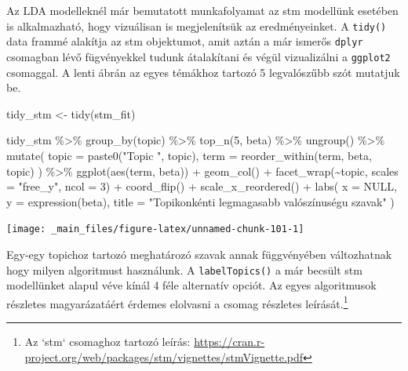 \documentclass[
]{book}
\newenvironment{Shaded}{\begin{snugshade}}{\end{snugshade}}
\newcommand{\AttributeTok}[1]{\textcolor[rgb]{0.77,0.63,0.00}{#1}}
\newcommand{\ConstantTok}[1]{\textcolor[rgb]{0.00,0.00,0.00}{#1}}
\newcommand{\DecValTok}[1]{\textcolor[rgb]{0.00,0.00,0.81}{#1}}
\newcommand{\FunctionTok}[1]{\textcolor[rgb]{0.00,0.00,0.00}{#1}}
\newcommand{\NormalTok}[1]{#1}
\newcommand{\OtherTok}[1]{\textcolor[rgb]{0.56,0.35,0.01}{#1}}
\newcommand{\SpecialCharTok}[1]{\textcolor[rgb]{0.00,0.00,0.00}{#1}}
\newcommand{\StringTok}[1]{\textcolor[rgb]{0.31,0.60,0.02}{#1}}
\begin{document}
Az LDA modelleknél már bemutatott munkafolyamat az stm modellünk
esetében is alkalmazható, hogy vizuálisan is megjelenítsük az
eredményeinket. A \texttt{tidy()} data frammé alakítja az stm
objektumot, amit aztán a már ismerős \texttt{dplyr} csomagban lévő
fügvényekkel tudunk átalakítani és végül vizualizálni a \texttt{ggplot2}
csomaggal. A lenti ábrán az egyes témákhoz tartozó 5 legvalószűbb szót
mutatjuk be.

\begin{Shaded}
\begin{Highlighting}[]

\NormalTok{tidy\_stm }\OtherTok{\textless{}{-}} \FunctionTok{tidy}\NormalTok{(stm\_fit)}

\NormalTok{tidy\_stm }\SpecialCharTok{\%\textgreater{}\%}
  \FunctionTok{group\_by}\NormalTok{(topic) }\SpecialCharTok{\%\textgreater{}\%}
  \FunctionTok{top\_n}\NormalTok{(}\DecValTok{5}\NormalTok{, beta) }\SpecialCharTok{\%\textgreater{}\%}
  \FunctionTok{ungroup}\NormalTok{() }\SpecialCharTok{\%\textgreater{}\%}
  \FunctionTok{mutate}\NormalTok{(}
    \AttributeTok{topic =} \FunctionTok{paste0}\NormalTok{(}\StringTok{"Topic "}\NormalTok{, topic),}
    \AttributeTok{term =} \FunctionTok{reorder\_within}\NormalTok{(term, beta, topic)}
\NormalTok{  ) }\SpecialCharTok{\%\textgreater{}\%}
  \FunctionTok{ggplot}\NormalTok{(}\FunctionTok{aes}\NormalTok{(term, beta)) }\SpecialCharTok{+}
  \FunctionTok{geom\_col}\NormalTok{() }\SpecialCharTok{+}
  \FunctionTok{facet\_wrap}\NormalTok{(}\SpecialCharTok{\textasciitilde{}}\NormalTok{topic, }\AttributeTok{scales =} \StringTok{"free\_y"}\NormalTok{, }\AttributeTok{ncol =} \DecValTok{3}\NormalTok{) }\SpecialCharTok{+}
  \FunctionTok{coord\_flip}\NormalTok{() }\SpecialCharTok{+}
  \FunctionTok{scale\_x\_reordered}\NormalTok{() }\SpecialCharTok{+}
  \FunctionTok{labs}\NormalTok{(}
    \AttributeTok{x =} \ConstantTok{NULL}\NormalTok{,}
    \AttributeTok{y =} \FunctionTok{expression}\NormalTok{(beta),}
    \AttributeTok{title =} \StringTok{"Topikonkénti legmagasabb valószínuségu szavak"}
\NormalTok{  )}
\end{Highlighting}
\end{Shaded}

\begin{center}\texttt{[image: \_main\_files/figure-latex/unnamed-chunk-101-1]} \end{center}

Egy-egy topichoz tartozó meghatározó szavak annak függvényében
változhatnak hogy milyen algoritmust használunk. A
\texttt{labelTopics()} a már becsült stm modellünket alapul véve kínál 4
féle alternatív opciót. Az egyes algoritmusok részletes magyarázatáért
érdemes elolvasni a csomag részletes leírását.\footnote{Az `stm`
  csomaghoz tartozó leírás:
  \url{https://cran.r-project.org/web/packages/stm/vignettes/stmVignette.pdf}}
\end{document}
